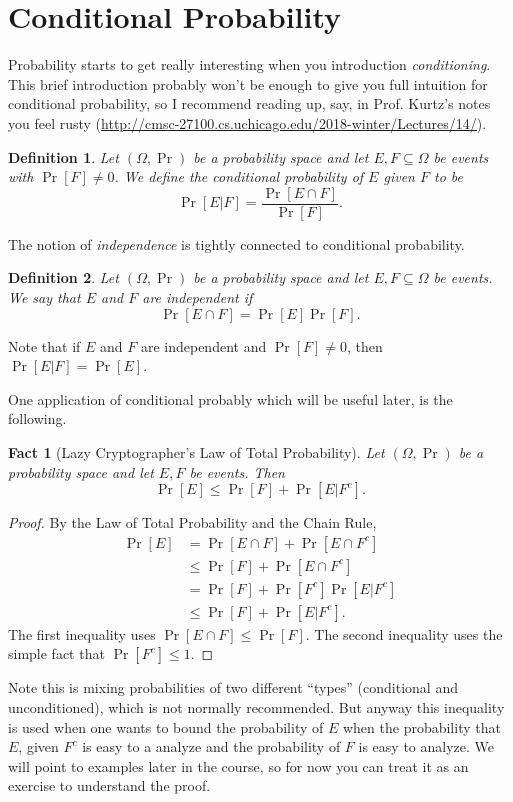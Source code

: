 \documentclass[11pt]{article}
\newtheorem{fact}{Fact}
\newtheorem{definition}{Definition}
\begin{document}
\section{Conditional Probability}

Probability starts to get really interesting when you introduction
\emph{conditioning}. This brief introduction probably won't be enough
to give you full intuition for conditional probability, so I recommend
reading up, say, in Prof. Kurtz's notes you feel rusty (\url{http://cmsc-27100.cs.uchicago.edu/2018-winter/Lectures/14/}).


\begin{definition}
    Let $(\Omega,\Pr)$ be a probability space 
    and let $E,F\subseteq \Omega$ be events with $\Pr[F] \neq 0$. We define
    the \emph{conditional probability of $E$ given $F$} to be
    \[
        \Pr[E|F] = \frac{\Pr[E\cap F]}{\Pr[F]}.
    \]
\end{definition}

The notion of \emph{independence} is tightly connected to conditional
probability.
\begin{definition}
    Let $(\Omega,\Pr)$ be a probability space 
    and let $E,F\subseteq \Omega$ be events.
    We say that $E$ and $F$ are \emph{independent} if
    \[
        \Pr[E \cap F] = \Pr[E] \Pr[F].
    \]
\end{definition}
Note that if $E$ and $F$ are independent and $\Pr[F] \neq 0$, then
$\Pr[E|F] = \Pr[E]$.



One application of conditional probably which will be useful later, is the
following.
\begin{fact}[Lazy Cryptographer's Law of Total Probability]
    Let $(\Omega,\Pr)$ be a probability space and let $E,F$ be events. Then
    \[
        \Pr[E] \leq \Pr[F] + \Pr[E|F^c].
    \]
\end{fact}

\begin{proof}
    By the Law of Total Probability and the Chain Rule,
    \begin{align*}
        \Pr[E] &= \Pr[E\cap F] + \Pr[E \cap F^c] \\
        & \leq \Pr[F] + \Pr[E \cap F^c] \\
        & = \Pr[F] + \Pr[F^c]\Pr[E|F^c] \\
        & \leq \Pr[F] + \Pr[E|F^c].
    \end{align*}
    The first inequality uses $\Pr[E\cap F] \leq \Pr[F]$. The
    second inequality uses the simple fact that $\Pr[F^c] \leq 1$.
\end{proof}
Note this is mixing probabilities of two different ``types'' (conditional and
unconditioned), which is not normally recommended. But anyway this inequality
is used when one wants to bound the probability of $E$ when the probability
that $E$, given $F^c$ is easy to a analyze and the probability of $F$ is easy
to analyze. We will point to examples later in the course, so for now you can
treat it as an exercise to understand the proof.
\end{document}
